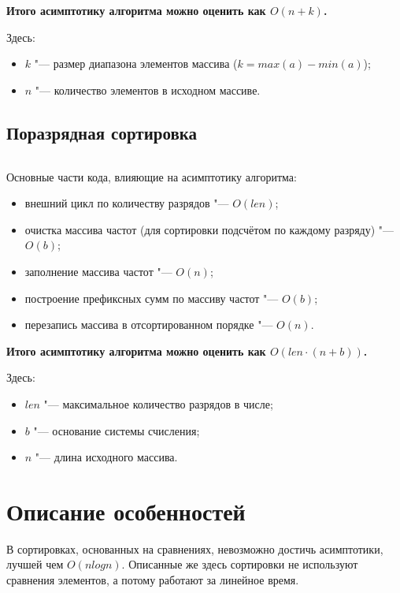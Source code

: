 \documentclass[otchet]{../SCWorks}
\begin{document}
\textbf{Итого асимптотику алгоритма можно оценить как $O(n + k)$.}

Здесь:
\begin{itemize}
	\item[$\bullet$] $k$ "--- размер диапазона элементов массива ($k = max(a) - min(a)$);
	\item[$\bullet$] $n$ "--- количество элементов в исходном массиве.
\end{itemize}

\subsection{Поразрядная сортировка}
\small
\inputminted[breaklines]{cpp}{./radix_sort.cpp}
\normalsize

Основные части кода, влияющие на асимптотику алгоритма:

\begin{itemize}
	\item внешний цикл по количеству разрядов "--- $O(len)$;
	\item очистка массива частот (для сортировки подсчётом по каждому разряду) "--- $O(b)$;
	\item заполнение массива частот "--- $O(n)$;
	\item построение префиксных сумм по массиву частот "--- $O(b)$;
	\item перезапись массива в отсортированном порядке "--- $O(n)$.
\end{itemize}

\textbf{Итого асимптотику алгоритма можно оценить как $O(len \cdot (n + b))$.}

Здесь:
\begin{itemize}
	\item[$\bullet$] $len$ "--- максимальное количество разрядов в числе;
	\item[$\bullet$] $b$ "--- основание системы счисления;
	\item[$\bullet$] $n$ "--- длина исходного массива.
\end{itemize}

\section{Описание особенностей}

В сортировках, основанных на сравнениях, невозможно достичь асимптотики, лучшей чем $O(n log n)$. Описанные же здесь сортировки не используют сравнения элементов, а потому работают за линейное время.
\end{document}
